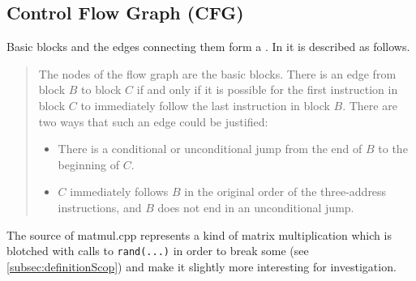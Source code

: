 \subsection{Control Flow Graph (CFG)}\label{subsec:cfg}
Basic blocks and the edges connecting them form a \cfg.
In \cite[chapter 8.4.3, p.~529]{Drachenbuch} it is described as follows.

\begin{quotation}\noindent
    \grqq The nodes of the flow graph are the basic blocks.
    There is an edge from block \(B\) to block \(C\) if and only if it is possible for the first instruction in block \(C\) to immediately follow the last instruction in block \(B\).
    There are two ways that such an edge could be justified:
    \begin{itemize}
        \item There is a conditional or unconditional jump from the end of \(B\) to the beginning of \(C\).
        \item \(C\) immediately follows \(B\) in the original order of the three-address instructions, and \(B\) does not end in an unconditional jump.\grqq
    \end{itemize}
\end{quotation}
\begin{code}
    \caption[Source of matmul.cpp]{The source of matmul.cpp represents a kind of matrix multiplication which is blotched with calls to \texttt{rand(...)} in order to break some \scops (see \autoref{subsec:definitionScop}) and make it slightly more interesting for investigation.}
    \inputminted{c++}{cpp/matmul.cpp}
    \label{lst:matmulcpp}
\end{code}
